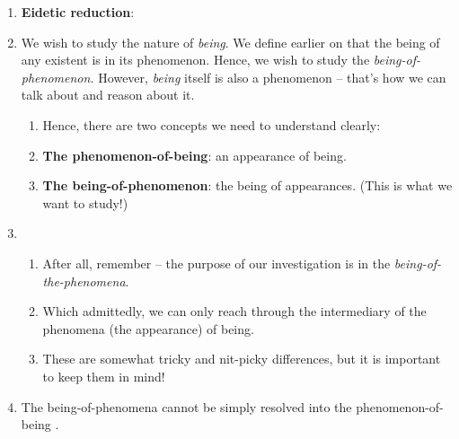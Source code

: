 \begin{enumerate}
  \item \textbf{Eidetic reduction}: 
  \item We wish to study the nature of \emph{being}. We define earlier on that the being of any existent is in its phenomenon. Hence, we wish to study the \emph{being-of-phenomenon.} However, \emph{being} itself is also a phenomenon -- that's how we can talk about and reason about it.  \begin{enumerate}
    \item Hence, there are two concepts we need to understand clearly:
    \item \textbf{The phenomenon-of-being}: an appearance of being.
    \item \textbf{The being-of-phenomenon}: the being of appearances. (This is what we want to study!)
  \end{enumerate}
  \item {}
  \begin{enumerate}
    \item After all, remember -- the purpose of our investigation is in the \emph{being-of-the-phenomena}.
    \item Which admittedly, we can only reach through the intermediary of the phenomena (the appearance) of being.
    \item These are somewhat tricky and nit-picky differences, but it is important to keep them in mind!
  \end{enumerate}
  \item The being-of-phenomena cannot be simply resolved into the phenomenon-of-being \autocite[7]{sartre}.
  \begin{enumerate}

\end{enumerate}
\end{enumerate}
